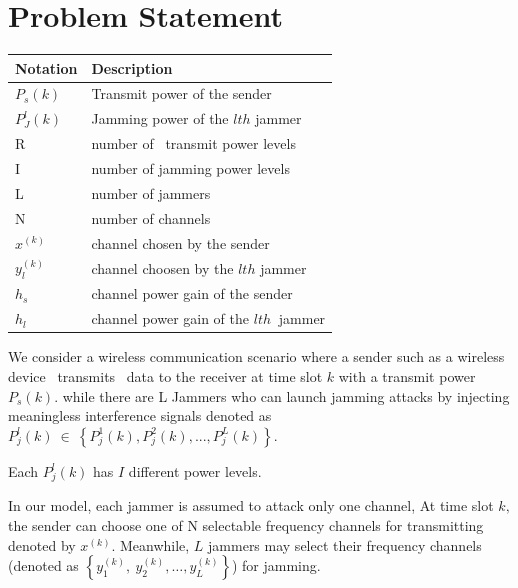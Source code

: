 \documentclass[letterpaper%
, twoside%
, 12pt%
,thesepararticles%
, english%
,creativecommons,hyperref, withAlgo2e%
]{thETS}
\begin{document}
\section{Problem Statement}

\begin{table}[!h]
        \centering        
\begin{tabular}{|p{}|p{}|}
\hline 
 Notation & Description \\
\hline 
 $\displaystyle P_{s}( k)$ & Transmit power of the sender  \\
\hline 
 $\displaystyle P^{l}_{J}( k)$ & Jamming power of the $\displaystyle lth$ jammer \\
\hline 
 R & number of \ transmit power levels \\
\hline 
 I & number of jamming power levels \\
\hline 
 L & number of jammers \\
\hline 
 N  & number of channels \\
\hline 
 $\displaystyle x^{( k)}$ & channel chosen by the sender \\
\hline 
 $\displaystyle y^{( k)}_{l}$ & channel choosen by the $\displaystyle lth$ jammer \\
\hline 
 $\displaystyle h_{s}$ & channel power gain of the sender \\
\hline 
 $\displaystyle h_{l}$ & channel power gain of the $\displaystyle lth\ $ jammer \\
 \hline
\end{tabular}        
\end{table}

We consider a wireless communication scenario where a sender such as a wireless device \ transmits \ data to the receiver at time slot $\displaystyle k$ with a transmit power $\displaystyle P_{s}( k)$. while there are L Jammers who can launch jamming attacks by injecting meaningless interference signals denoted as $\displaystyle P^{l}_{j}( k) \ \in \ \left\{P^{1}_{j}( k) ,P^{2}_{j}( k) ,...,P^{L}_{j}( k)\right\} .$

Each $\displaystyle P^{l}_{j}( k)$ has $\displaystyle I$ different power levels. 

In our model, each jammer is assumed to attack only one channel, At time slot $\displaystyle k,$the sender can choose one of N selectable frequency channels for transmitting denoted by $\displaystyle x^{( k)} .$ Meanwhile, $\displaystyle L$ jammers may select their frequency channels (denoted as $\displaystyle \left\{y^{( k)}_{1} ,\ y^{( k)}_{2} ,\dotsc ,y^{( k)}_{L}\right\}$) for jamming. 
\end{document}
